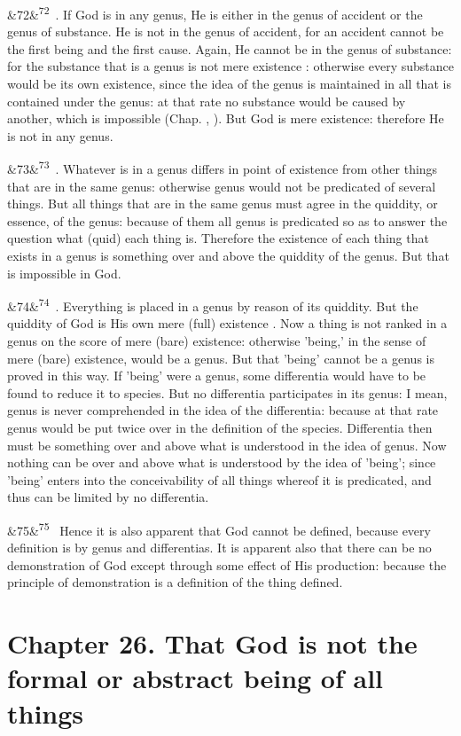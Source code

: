 \documentclass[12pt]{article}
\newcommand{\para}[1][]{\par\noindent\ifx&#1&\else\textsuperscript{\footnotesize #1}~\fi}
\begin{document}
\para[72] 2. If God is in any genus, He is either in the genus of accident or the genus of substance. He is not in the genus of accident, for an accident cannot be the first being and the first cause. Again, He cannot be in the genus of substance: for the substance that is a genus is not mere existence : otherwise every substance would be its own existence, since the idea of the genus is maintained in all that is contained under the genus: at that rate no substance would be caused by another, which is impossible (Chap. , ). But God is mere existence: therefore He is not in any genus.

\para[73] 3. Whatever is in a genus differs in point of existence from other things that are in the same genus: otherwise genus would not be predicated of several things. But all things that are in the same genus must agree in the quiddity, or essence, of the genus: because of them all genus is predicated so as to answer the question what (quid) each thing is. Therefore the existence of each thing that exists in a genus is something over and above the quiddity of the genus. But that is impossible in God.

\para[74] 4. Everything is placed in a genus by reason of its quiddity. But the quiddity of God is His own mere (full) existence . Now a thing is not ranked in a genus on the score of mere (bare) existence: otherwise 'being,' in the sense of mere (bare) existence, would be a genus. But that 'being' cannot be a genus is proved in this way. If 'being' were a genus, some differentia would have to be found to reduce it to species. But no differentia participates in its genus: I mean, genus is never comprehended in the idea of the differentia: because at that rate genus would be put twice over in the definition of the species. Differentia then must be something over and above what is understood in the idea of genus. Now nothing can be over and above what is understood by the idea of 'being'; since 'being' enters into the conceivability of all things whereof it is predicated, and thus can be limited by no differentia.

\para[75] Hence it is also apparent that God cannot be defined, because every definition is by genus and differentias. It is apparent also that there can be no demonstration of God except through some effect of His production: because the principle of demonstration is a definition of the thing defined.

\section*{Chapter 26. That God is not the formal or abstract being of all things}
\end{document}
